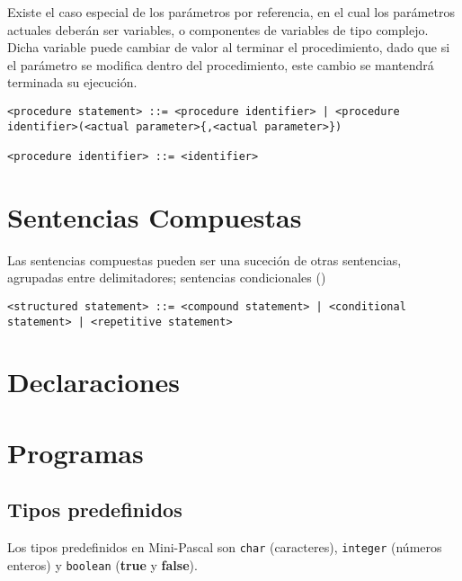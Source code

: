 \documentclass[a4paper,oneside]{report}
\begin{document}
Existe el caso especial de los parámetros por referencia, en el cual los parámetros actuales deberán ser variables, o componentes de variables de tipo complejo. Dicha variable puede cambiar de valor al terminar el procedimiento, dado que si el parámetro se modifica dentro del procedimiento, este cambio se mantendrá terminada su ejecución.

\begin{verbatim}
<procedure statement> ::= <procedure identifier> | <procedure identifier>(<actual parameter>{,<actual parameter>})

<procedure identifier> ::= <identifier>
\end{verbatim}



\section{Sentencias Compuestas}

Las sentencias compuestas pueden ser una suceción de otras sentencias, agrupadas entre delimitadores; sentencias condicionales (\texttt{})

\begin{verbatim}
<structured statement> ::= <compound statement> | <conditional statement> | <repetitive statement>
\end{verbatim}

\section{Declaraciones}


\section{Programas}


\subsection{Tipos predefinidos}
Los tipos predefinidos en Mini-Pascal son \texttt{char} (caracteres), \texttt{integer} (números enteros) y \texttt{boolean} (\textbf{true} y \textbf{false}).
\end{document}
